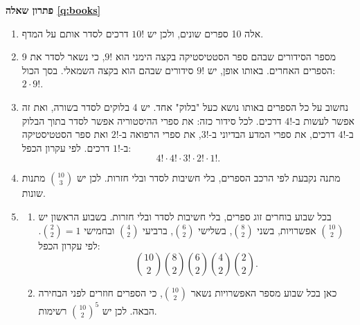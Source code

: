 \documentclass[11pt,a4paper]{report}
\newenvironment{solution}[1]{\par\bigskip\noindent
  {\sffamily\bfseries\color{thmc}פתרון שאלה \ref{q:#1}}\par\nopagebreak\smallskip}%
  {\par\medskip\noindent{\color{exc!50}\rule{\linewidth}{0.4pt}}\par}
\newcommand{\ans}[1]{\boxed{#1}}
\begin{document}
\begin{solution}{books}
\begin{enumerate}[label=(\alph*)]
  \item אלה 10 ספרים שונים, ולכן יש $\ans{10!}$ דרכים לסדר אותם על המדף.
  \item מספר הסידורים שבהם ספר הסטטיסטיקה בקצה הימני הוא $9!$, כי נשאר לסדר את 9 הספרים האחרים. באותו אופן, יש $9!$ סידורים שבהם הוא בקצה השמאלי. בסך הכול: $\ans{2\cdot9!}$.
  \item נחשוב על כל הספרים באותו נושא כעל "בלוק" אחד. יש 4 בלוקים לסדר בשורה, ואת זה אפשר לעשות ב-$4!$ דרכים. לכל סידור כזה: את ספרי ההיסטוריה אפשר לסדר בתוך הבלוק ב-$4!$ דרכים, את ספרי המדע הבדיוני ב-$3!$, את ספרי הרפואה ב-$2!$ ואת ספר הסטטיסטיקה ב-$1!$ דרכים. לפי עקרון הכפל:
  \[
    \ans{4!\cdot4!\cdot3!\cdot2!\cdot1!}.
  \]
  \item מתנה נקבעת לפי הרכב הספרים, בלי חשיבות לסדר ובלי חזרות. לכן יש $\ans{\binom{10}3}$ מתנות שונות.
  \item
  \begin{enumerate}[label=(\arabic*)]
    \item בכל שבוע בוחרים זוג ספרים, בלי חשיבות לסדר ובלי חזרות. בשבוע הראשון יש $\binom{10}2$ אפשרויות, בשני $\binom82$, בשלישי $\binom62$, ברביעי $\binom42$ ובחמישי $\binom22=1$. לפי עקרון הכפל:
    \[
      \ans{\binom{10}2\binom82\binom62\binom42\binom22}.
    \]
    \item כאן בכל שבוע מספר האפשרויות נשאר $\binom{10}2$, כי הספרים חוזרים לפני הבחירה הבאה. לכן יש $\ans{\binom{10}2^5}$ רשימות.
  \end{enumerate}
\end{enumerate}
\end{solution}
\end{document}

